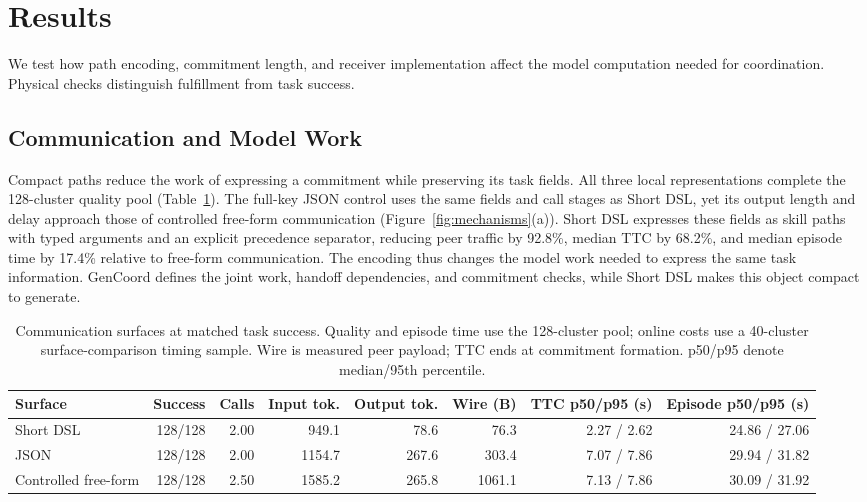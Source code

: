 \documentclass[sigconf,nonacm,balance=false]{aamas}
\newcommand{\tabstyle}{\small\setlength{\tabcolsep}{3pt}\renewcommand{\arraystretch}{1.10}}
\begin{document}
\section{Results}
\label{sec:results}
We test how path encoding, commitment length, and receiver implementation affect the model computation needed for coordination. Physical checks distinguish fulfillment from task success.
\subsection{Communication and Model Work}
\label{sec:cost-results}
Compact paths reduce the work of expressing a commitment while preserving its task fields. All three local representations complete the 128-cluster quality pool (Table~\ref{tab:main}). The full-key JSON control uses the same fields and call stages as Short DSL, yet its output length and delay approach those of controlled free-form communication (Figure~\ref{fig:mechanisms}(a)). Short DSL expresses these fields as skill paths with typed arguments and an explicit precedence separator, reducing peer traffic by 92.8\%, median TTC by 68.2\%, and median episode time by 17.4\% relative to free-form communication. The encoding thus changes the model work needed to express the same task information. GenCoord defines the joint work, handoff dependencies, and commitment checks, while Short DSL makes this object compact to generate.

\begin{table}[t]
\centering
\caption{Communication surfaces at matched task success. Quality and episode time use the 128-cluster pool; online costs use a 40-cluster surface-comparison timing sample. Wire is measured peer payload; TTC ends at commitment formation. p50/p95 denote median/95th percentile. }
\label{tab:main}
\tabstyle
\begin{tabular*}{\textwidth}{@{\extracolsep{\fill}}lrrrrrrr@{}}
\toprule
\textbf{Surface} & \textbf{Success} & \textbf{Calls} & \textbf{Input tok.} & \textbf{Output tok.} & \textbf{Wire (B)} & \textbf{TTC p50/p95 (s)} & \textbf{Episode p50/p95 (s)} \\
\midrule
Short DSL & 128/128 & 2.00 & 949.1 & 78.6 & 76.3 & 2.27 / 2.62 & 24.86 / 27.06 \\
JSON & 128/128 & 2.00 & 1154.7 & 267.6 & 303.4 & 7.07 / 7.86 & 29.94 / 31.82 \\
Controlled free-form & 128/128 & 2.50 & 1585.2 & 265.8 & 1061.1 & 7.13 / 7.86 & 30.09 / 31.92 \\
\bottomrule
\end{tabular*}
\end{table}
\end{document}
